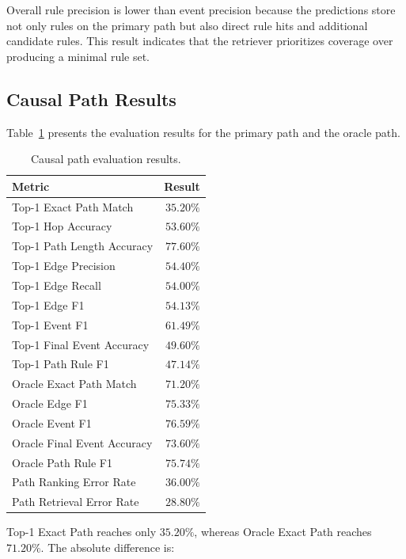 Overall rule precision is lower than event precision because the predictions
store not only rules on the primary path but also direct rule hits and
additional candidate rules. This result indicates that the retriever
prioritizes coverage over producing a minimal rule set.

\subsection{Causal Path Results}

Table~\ref{tab:path-results} presents the evaluation results for the primary
path and the oracle path.

\begin{table}[t]
    \centering
    \caption{Causal path evaluation results.}
    \label{tab:path-results}
    \begin{tabular}{lr}
        \hline
        \textbf{Metric} & \textbf{Result} \\
        \hline
        Top-1 Exact Path Match & \(35.20\%\) \\
        Top-1 Hop Accuracy & \(53.60\%\) \\
        Top-1 Path Length Accuracy & \(77.60\%\) \\
        Top-1 Edge Precision & \(54.40\%\) \\
        Top-1 Edge Recall & \(54.00\%\) \\
        Top-1 Edge F1 & \(54.13\%\) \\
        Top-1 Event F1 & \(61.49\%\) \\
        Top-1 Final Event Accuracy & \(49.60\%\) \\
        Top-1 Path Rule F1 & \(47.14\%\) \\
        \hline
        Oracle Exact Path Match & \(71.20\%\) \\
        Oracle Edge F1 & \(75.33\%\) \\
        Oracle Event F1 & \(76.59\%\) \\
        Oracle Final Event Accuracy & \(73.60\%\) \\
        Oracle Path Rule F1 & \(75.74\%\) \\
        \hline
        Path Ranking Error Rate & \(36.00\%\) \\
        Path Retrieval Error Rate & \(28.80\%\) \\
        \hline
    \end{tabular}
\end{table}

Top-1 Exact Path reaches only \(35.20\%\), whereas Oracle Exact Path reaches
\(71.20\%\). The absolute difference is:

